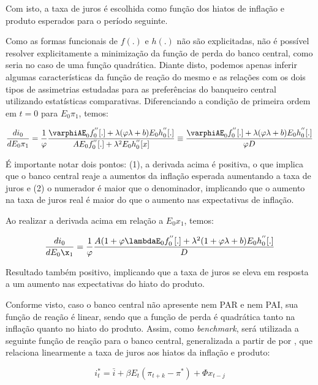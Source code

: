 \documentclass[
	article,			%
	11pt,				%
	oneside,			%
	a4paper,			%
	english,			%
	brazil,				%
	]{abntex2}
\begin{document}
	Com isto, a taxa de juros é escolhida como função dos hiatos de inflação e produto esperados para o período seguinte.
	
	Como as formas funcionais de $f(.)$ e $h(.)$ não são explicitadas, não é possível resolver explicitamente a minimização da função de perda do banco central, como seria no caso de uma função quadrática. Diante disto, podemos apenas inferir algumas características da função de reação do mesmo e as relações com os dois tipos de assimetrias estudadas para as preferências do banqueiro central utilizando estatísticas comparativas. Diferenciando a condição de primeira ordem em $t=0$ para $E_0\pi_1$, temos:
	
	\begin{equation}
		\frac{di_0}{dE_0\pi_1} = \frac{1}{\varphi} \frac{\varphiAE_0f_0^{''}[.] + \lambda(\varphi\lambda + b)E_0h_0^{''}[.]}{AE_0f_0^{''}[.] + \lambda^2E_0h_0^{''}[x]} \equiv \frac{\varphiAE_0f_0^{''}[.] + \lambda(\varphi\lambda + b)E_0h_0^{''}[.]}{\varphi D}
	\end{equation}
	
	É importante notar dois pontos: (1), a derivada acima é positiva, o que implica que o banco central reaje a aumentos da inflação esperada aumentando a taxa de juros e (2) o numerador é maior que o denominador, implicando que o aumento na taxa de juros real é maior do que o aumento nas expectativas de inflação.
	
	Ao realizar a derivada acima em relação a $E_0x_1$, temos:
	
	\begin{equation}
		\frac{di_0}{dE_0\x_1} = \frac{1}{\varphi} \frac{A(1+\varphi\lambdaE_0f_0^{''}[.] + \lambda^2(1 + \varphi\lambda + b)E_0h_0^{''}[.]}{D} 
	\end{equation}
	
	Resultado também positivo, implicando que a taxa de juros se eleva em resposta a um aumento nas expectativas do hiato do produto.
	
	Conforme visto, caso o banco central não apresente nem PAR e nem PAI, sua função de reação é linear, sendo que a função de perda é quadrática tanto na inflação quanto no hiato do produto. Assim, como \textit{benchmark}, será utilizada a seguinte função de reação para o banco central, generalizada a partir de  por , que relaciona linearmente a taxa de juros aos hiatos da inflação e produto:
	
	\begin{equation}
		i_t^* = \bar{i} + \beta E_t(\pi_{t+k} - \pi^*) + \Phi x_{t-j}
	\end{equation}
	
\end{document}
